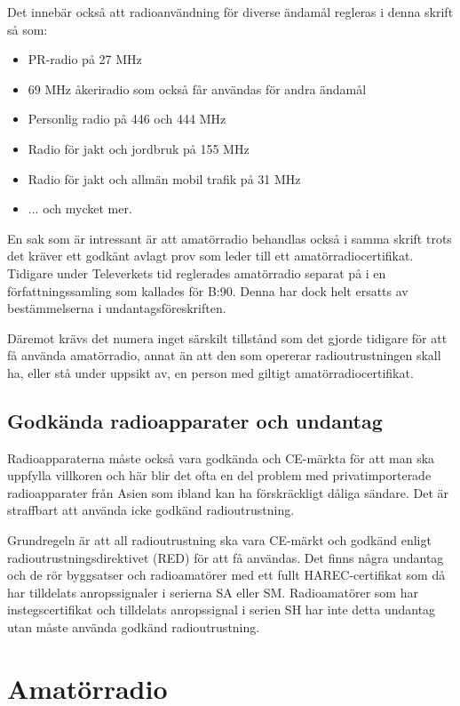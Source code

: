 Det innebär också att radioanvändning för diverse ändamål regleras i denna
skrift så som:

\begin{itemize}
 \item PR-radio på 27 MHz
 \item 69 MHz åkeriradio som också får användas för andra ändamål
 \item Personlig radio på 446 och 444 MHz
 \item Radio för jakt och jordbruk på 155 MHz
 \item Radio för jakt och allmän mobil trafik på 31 MHz
 \item ... och mycket mer.
\end{itemize}

En sak som är intressant är att amatörradio behandlas också i samma skrift
trots det kräver ett godkänt avlagt prov som leder till ett
amatörradiocertifikat. Tidigare under Televerkets tid reglerades amatörradio
separat på i en författningssamling som kallades för B:90. Denna har dock helt
ersatts av bestämmelserna i undantagsföreskriften.

Däremot krävs det numera inget särskilt tillstånd som det gjorde tidigare för
att få använda amatörradio, annat än att den som opererar radioutrustningen
skall ha, eller stå under uppsikt av, en person med giltigt
amatörradiocertifikat.

\subsection{Godkända radioapparater och undantag}

Radioapparaterna måste också vara godkända och CE-märkta för att man ska
uppfylla villkoren och här blir det ofta en del problem med privatimporterade
radioapparater från Asien som ibland kan ha förskräckligt dåliga sändare. Det
är straffbart att använda icke godkänd radioutrustning.

Grundregeln är att all radioutrustning ska vara CE-märkt och godkänd enligt
radioutrustningsdirektivet (RED) för att få användas. Det finns några
undantag och de rör byggsatser och radioamatörer med ett fullt HAREC-certifikat
som då har tilldelats anropssignaler i serierna SA eller SM. Radioamatörer som
har instegscertifikat och tilldelats anropssignal i serien SH har inte detta
undantag utan måste använda godkänd radioutrustning.

\section{Amatörradio}

